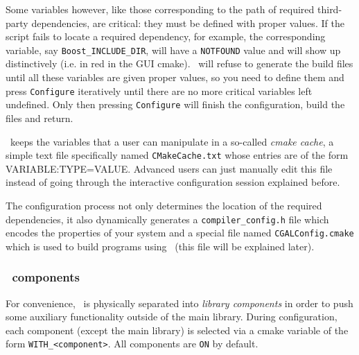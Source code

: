 Some variables however, like those corresponding to the path of required third-party dependencies, are critical: they 
must be defined with proper values. If the script fails to locate a required dependency, for example, the corresponding variable,
say \texttt{Boost\_INCLUDE\_DIR}, will have a \texttt{NOTFOUND} value and will show up distinctively (i.e. in red in the GUI cmake).
\cmake\ will refuse to generate the build files until all these variables are given proper values, so you need
to define them and press \texttt{Configure} iteratively until there are no more critical variables left undefined. Only then
pressing \texttt{Configure} will finish the configuration, build the files and return.

\begin{ccAdvanced}
\cmake\ keeps the variables that a user can manipulate in a so-called {\em cmake cache}, a simple text file specifically 
named \texttt{CMakeCache.txt} whose entries are of the form VARIABLE:TYPE=VALUE. Advanced users can just manually edit this 
file instead of going through the interactive configuration session explained before.
\end{ccAdvanced}


The configuration process not only determines the location of the required dependencies, it also dynamically generates a
\texttt{compiler\_config.h} file which encodes the properties of your system and a special file named 
\texttt{CGALConfig.cmake} which is used to build programs using \cgal\ (this file will be explained later).

\subsubsection{\cgal\ components}

For convenience, \cgal\ is physically separated into {\em library components} in order to push some auxiliary 
functionality outside of the main library. During configuration, each component (except the main library) is selected 
via a cmake variable of the form {\tt WITH\_<component>}. All components are \texttt{ON} by default.

